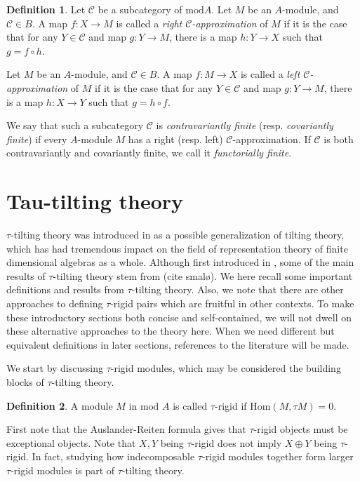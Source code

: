 \documentclass[]{article}
\theoremstyle{definition}
\newtheorem{definition}{Definition}[section]
\newcommand{\mo}{\ensuremath{\text{mod }}}
\newcommand{\Hom}{\ensuremath{\text{Hom}}}
\newcommand{\tu}{\ensuremath{\tau}}
\begin{document}
\begin{definition}
	Let $\mathcal{C}$ be a subcategory of $\text{mod} A$.  Let $M$ be an $A$-module, and $\mathcal{C} \in B$. A map $f:X \to M$ is called a \textit{right $\mathcal{C}$-approximation} of $M$ if it is the case that for any $Y \in \mathcal{C}$ and map $g:Y \to M$, there is a map $h:Y \to X$ such that $g = f \circ h$. 
	
	Let $M$ be an $A$-module, and $\mathcal{C} \in B$. A map $f:M \to X$ is called a \textit{left $\mathcal{C}$-approximation} of $M$ if it is the case that for any $Y \in \mathcal{C}$ and map $g:Y \to M$, there is a map $h:X \to Y$ such that $g = h \circ f$. 
\end{definition}

We say that such a subcategory $\mathcal{C}$ is \textit{contravariantly finite} (resp. \textit{covariantly finite}) if every $A$-module $M$ has a right (resp. left) $\mathcal{C}$-approximation. If $\mathcal{C}$ is both contravariantly and covariantly finite, we call it \textit{functorially finite}.


\section{Tau-tilting theory}
$\tau$-tilting theory was introduced in \cite{tau} as a possible generalization of tilting theory, which has had tremendous impact on the field of representation theory of finite dimensional algebras as a whole. Although first introduced in \cite{tau}, some of the main results of $\tau$-tilting theory stem from (cite smalø). We here recall some important definitions and results from $\tau$-tilting theory. Also, we note that there are other approaches to defining \tu-rigid pairs which are fruitful in other contexts. To make these introductory sections both concise and self-contained, we will not dwell on these alternative approaches to the theory here.  When we need different but equivalent definitions in later sections, references to the literature will be made.

We start by discussing $\tau$-rigid modules, which may be considered the building blocks of $\tau$-tilting theory. 


\begin{definition}
	A module $M$ in $\mo A$ is called $\tau$-rigid if $\Hom(M,\tau M) = 0$.
\end{definition}

First note that the Auslander-Reiten formula gives that \tu-rigid objects must be exceptional objects. Note that $X,Y$ being $\tau$-rigid does not imply $X \oplus Y$ being $\tau$-rigid. In fact, studying how indecomposable $\tau$-rigid modules together form larger $\tau$-rigid modules is part of $\tau$-tilting theory.
\end{document}
